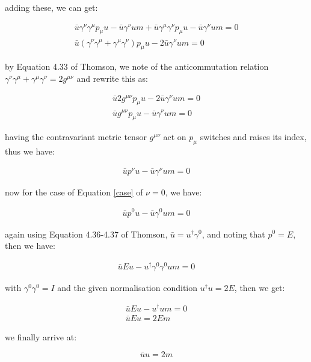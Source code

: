 \documentclass[11pt]{article}
\theoremstyle{definition}
\begin{document}
adding these, we can get:

\begin{align}
    \bar{u}\gamma^{\nu}\gamma^{\mu}p_{\mu}u - \bar{u}\gamma^{\nu}um
    + \bar{u}\gamma^{\mu}\gamma^{\nu}p_{\mu}u - \bar{u}\gamma^{\nu}um = 0\\
    \bar{u}(\gamma^{\nu}\gamma^{\mu} + \gamma^{\mu}\gamma^{\nu})p_{\mu}u - 2\bar{u}\gamma^{\nu}um = 0
\end{align}

by Equation 4.33 of Thomson, we note of the anticommutation relation $\gamma^{\nu}\gamma^{\mu} + \gamma^{\mu}\gamma^{\nu} = 2g^{\mu\nu}$ and rewrite this as:

\begin{align}
    \bar{u}2g^{\mu\nu}p_{\mu}u - 2\bar{u}\gamma^{\nu}um = 0\\
    \bar{u}g^{\mu\nu}p_{\mu}u - \bar{u}\gamma^{\nu}um = 0
\end{align}

having the contravariant metric tensor $g^{\mu\nu}$ act on $p_{\mu}$ switches and raises its index, thus we have:

\begin{align}\label{case}
    \bar{u}p^{\nu}u - \bar{u}\gamma^{\nu}um = 0
\end{align}

now for the case of Equation \ref{case} of $\nu=0$, we have:

\begin{align}
    \bar{u}p^{0}u - \bar{u}\gamma^{0}um = 0
\end{align}

again using Equation 4.36-4.37 of Thomson, $\bar{u} = u^{\dagger}\gamma^{0}$, and noting that $p^0 = E$, then we have:

\begin{align}
    \bar{u}Eu - u^{\dagger}\gamma^{0}\gamma^{0}um = 0
\end{align}

with $\gamma^0\gamma^0=I$ and the given normalisation condition $u^{\dagger}u=2E$, then we get:

\begin{align}
    \bar{u}Eu - u^{\dagger}um = 0\\
    \bar{u}Eu = 2Em 
\end{align}

we finally arrive at:

\begin{equation}\label{newdef}
\boxed{
    \bar{u}u = 2m
}
\end{equation}
\end{document}
